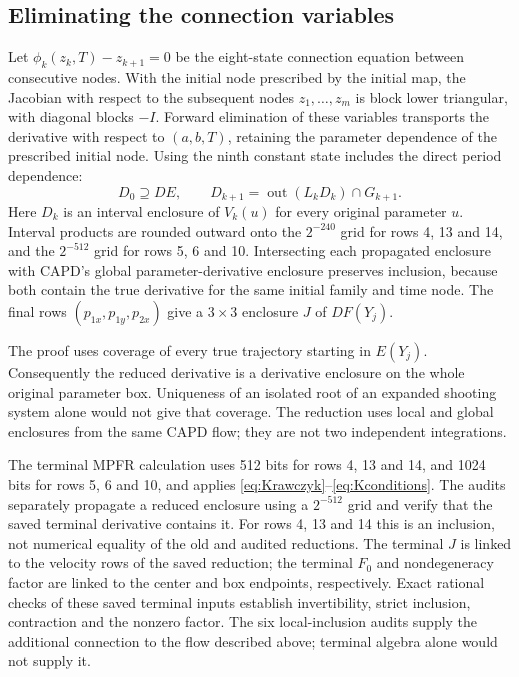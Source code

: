 \documentclass[10pt,a4paper]{article}
\theoremstyle{remark}
\begin{document}
\subsection{Eliminating the connection variables}
Let $\phi_k(z_k,T)-z_{k+1}=0$ be the eight-state connection equation
between consecutive nodes. With the initial node prescribed by the
initial map, the Jacobian with respect to the subsequent nodes
$z_1,\ldots,z_m$ is block lower triangular, with diagonal blocks $-I$.
Forward elimination of these variables transports the derivative with
respect to $(a,b,T)$, retaining the parameter dependence of the prescribed
initial node. Using the ninth constant state includes the direct period
dependence:
\begin{equation}
 D_0\supseteq DE,\qquad
 D_{k+1}=\operatorname{out}(L_kD_k)\cap G_{k+1}.
 \label{eq:elimination}
\end{equation}
Here $D_k$ is an interval enclosure of $V_k(u)$ for every original
parameter $u$. Interval products are rounded outward onto the
$2^{-240}$ grid for rows 4, 13 and 14, and the $2^{-512}$ grid for
rows 5, 6 and 10. Intersecting each propagated enclosure with CAPD's
global parameter-derivative enclosure preserves inclusion, because both
contain the true derivative for the same initial family and time node.
The final rows $(p_{1x},p_{1y},p_{2x})$ give a $3\times3$ enclosure $J$
of $DF(Y_j)$.

The proof uses coverage of every true trajectory starting in $E(Y_j)$.
Consequently the reduced derivative is a derivative enclosure on the
whole original parameter box. Uniqueness of an isolated root of an
expanded shooting system alone would not give that coverage. The
reduction uses local and global enclosures from the same CAPD flow; they
are not two independent integrations.

The terminal MPFR calculation uses 512 bits for rows 4, 13 and 14,
and 1024 bits for rows 5, 6 and 10, and applies
\eqref{eq:Krawczyk}--\eqref{eq:Kconditions}. The audits separately
propagate a reduced enclosure using a $2^{-512}$ grid and verify that
the saved terminal derivative contains it. For rows 4, 13 and 14 this is
an inclusion, not numerical equality of the old and audited reductions.
The terminal $J$ is linked to the velocity rows of the saved reduction;
the terminal $F_0$ and nondegeneracy factor are linked to the center and
box endpoints, respectively. Exact rational checks of these saved
terminal inputs establish invertibility, strict inclusion, contraction
and the nonzero factor. The six local-inclusion audits supply the
additional connection to the flow described above; terminal algebra
alone would not supply it.
\end{document}
